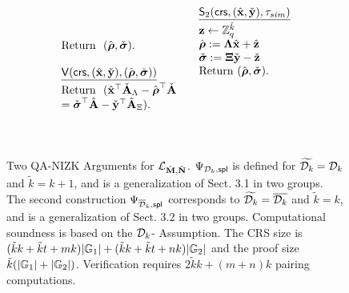 \begin{figure}
$$\begin{array}{lll}
\begin{array}{l}
 \text{Return } \  (\hat{{\boldsymbol \rho}},\check{{\boldsymbol \sigma}}). \\ \\
\underline{\mathsf{V}(\mathsf{crs},({\hat{\mathbf{x}}},\check{\mathbf{y}}), (\hat{{\boldsymbol \rho}},\check{{\boldsymbol \sigma}}))}\\ [.1cm]
\text{Return } \ ({\hat{\mathbf{x}}}^\top \check{\mathbf{{A}}}_\Lambda  - \hat{{\boldsymbol \rho}}^\top\check{\mathbf{{A}}}\\=  \check{{\boldsymbol \sigma}}^\top {\hat{\mathbf{{A}}}}-\check{\mathbf{y}}^\top {\hat{\mathbf{{A}}}}_\Xi).
\end{array}
&
\begin{array}{l}
\underline{\mathsf{S}_2(\mathsf{crs},({\hat{\mathbf{x}}},\check{\mathbf{y}}),\tau_{sim})}\\[.1cm]
\mathbf{z} \gets \mathbb{Z}_q^{\tilde{k}} \\ 
 \hat{{\boldsymbol \rho}}:=\mathbf{{\Lambda}} {\hat{\mathbf{x}}}+ {\hat{\mathbf{z}}}\\
\check{{\boldsymbol \sigma}}:=\mathbf{{\Xi}} \check{\mathbf{y}}- \check{\mathbf{z}}\\
 \text{Return }  (\hat{{\boldsymbol \rho}},\check{{\boldsymbol \sigma}}).
\\
\\
\\
\\
\\
\\
\end{array}\\
\end{array}
$$
\caption{Two QA-NIZK Arguments for  $\mathcal{L}_{{\hat{\mathbf{{M}}}},\check{\mathbf{{N}}}}$. $\Psi_{\mathcal{D}_k,\mathsf{spl}}$ is 
 defined for $\widetilde{\mathcal{D}_{k}}=\mathcal{D}_k$ and $\tilde{k}=k+1$, and is a generalization of  
 \cite{EC:KilWee15} Sect. 3.1 in two groups. The second construction $\Psi_{\overline{\mathcal{D}}_k,\mathsf{spl}}$ corresponds to $\widetilde{\mathcal{D}_{k}}=\overline{\mathcal{D}_k}$ and $\tilde{k}=k$, and is a generalization of   \cite{EC:KilWee15} Sect. 3.2 in two groups. Computational soundness is based on the $\mathcal{D}_{k}$-\skermdh{} Assumption. The CRS size is $(\tilde{k}k+\tilde{k}t+mk)|\mathbb{G}_1|+(\tilde{k}k+\tilde{k}t+nk)|\mathbb{G}_2|$ and the proof size $\tilde{k}(|\mathbb{G}_1|+|\mathbb{G}_2|)$. Verification requires $2\tilde{k}k+(m+n)k$ pairing computations. \label{fig:QANIZKtwogroups} }
\end{figure}

%
%
 
